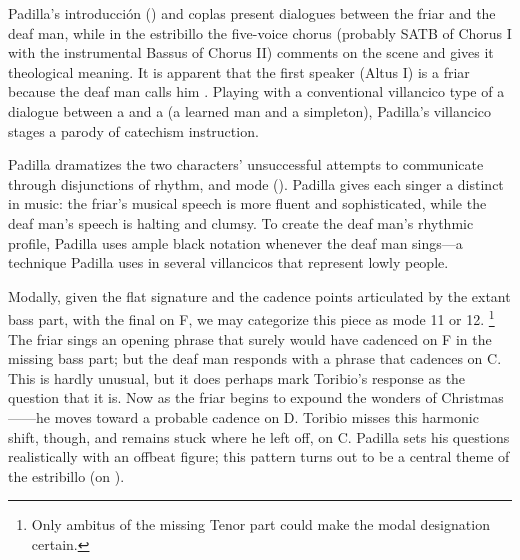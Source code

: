 Padilla's introducción () and coplas present dialogues between the friar and the deaf man, while in the estribillo the five-voice chorus (probably SATB of Chorus I with the instrumental Bassus of Chorus II) comments on the scene and gives it theological meaning.
It is apparent that the first speaker (Altus I) is a friar because the deaf man calls him .
Playing with a conventional villancico type of a dialogue between a  and a  (a learned man and a simpleton), Padilla's villancico stages a parody of catechism instruction.


Padilla dramatizes the two characters' unsuccessful attempts to communicate through disjunctions of rhythm, and mode ().
Padilla gives each singer a distinct  in music: the friar's musical speech is more fluent and sophisticated, while the deaf man's speech is halting and clumsy.
To create the deaf man's rhythmic profile, Padilla uses ample black notation whenever the deaf man sings---a technique Padilla uses in several villancicos that represent lowly people.

\begin{exmusic}
\caption{Padilla, , introducción, , extant parts (missing Tenor I, Bassus I)}
\label{exmusic:Padilla-Sordo-intro}
\end{exmusic}

Modally, given the flat  signature and the cadence points articulated by the extant bass part, with the final on F, we may categorize this piece as mode 11 or 12.%
  \footnote{Only ambitus of the missing Tenor part could make the modal designation certain.}
The friar sings an opening phrase that surely would have cadenced on F in the missing bass part; but the deaf man responds with a phrase that cadences on C.
This is hardly unusual, but it does perhaps mark Toribio's response as the question that it is.
Now as the friar begins to expound the wonders of Christmas------he moves toward a probable cadence on D.
Toribio misses this harmonic shift, though, and remains stuck where he left off, on C.
Padilla sets his questions  realistically with an offbeat figure; this pattern turns out to be a central theme of the estribillo (on ).

